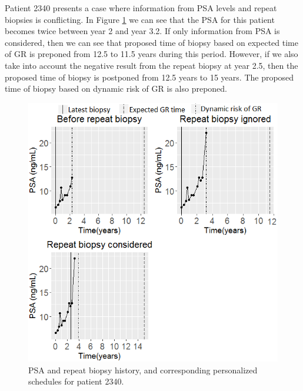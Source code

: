 Patient 2340 presents a case where information from PSA levels and repeat biopsies is conflicting. In Figure \ref{fig : prias_demo_pid_2340} we can see that the PSA for this patient becomes twice between year 2 and year 3.2. If only information from PSA is considered, then we can see that proposed time of biopsy based on expected time of GR is preponed from 12.5 to 11.5 years during this period. However, if we also take into account the negative result from the repeat biopsy at year 2.5, then the proposed time of biopsy is postponed from 12.5 years to 15 years. The proposed time of biopsy based on dynamic risk of GR is also preponed.

\begin{figure}
\centerline{\includegraphics[width=\columnwidth]{images/prias_demo/case_2340.png}}
\caption{PSA and repeat biopsy history, and corresponding personalized schedules for patient 2340.}
\label{fig : prias_demo_pid_2340}
\end{figure}